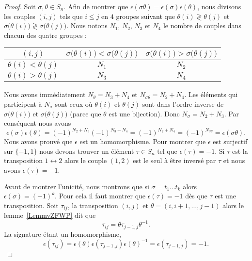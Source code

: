 \begin{proof}
    Soit \( \sigma,\theta \in S_n\). Afin de montrer que \( \epsilon(\sigma\theta )=\epsilon(\sigma)\epsilon(\theta )\), nous divisons les couples \( (i,j)\) tels que \( i\leq j\) en \( 4\) groupes suivant que \( \theta(i)\gtrless \theta(j)\) et \( \sigma\big( \theta(i) \big)\gtrless \sigma\big( \theta(j) \big)\). Nous notons \( N_1\), \( N_2\), \( N_3\) et \( N_4\) le nombre de couples dans chacun des quatre groupes :
    \begin{center}
    \begin{tabular}{c|c|c}
        $ (i,j)$&   \(\sigma\big( \theta(i) \big)<\sigma\big( \theta(j) \big)\)    &   \(\sigma\big( \theta(i) \big)>\sigma\big( \theta(j) \big)\)\\
        \hline
        \( \theta(i)<\theta(j)\)& \( N_1\)&\( N_2\)\\
        \hline
        \( \theta(i)>\theta(j)\)&\( N_3\)&\( N_4\)
    \end{tabular}
    \end{center}
    Nous avons immédiatement \( N_\theta=N_3+N_4\) et \( N_{\sigma\theta}=N_2+N_4\). Les éléments qui participent à \( N_\sigma\) sont ceux où \( \theta(i)\) et \(\theta(j)\) sont dans l'ordre inverse de \( \sigma\big( \theta(i) \big)\) et \( \sigma\big( \theta(j) \big)\) (parce que \(  \theta\) est une bijection). Donc \( N_\sigma=N_2+N_3\). Par conséquent nous avons
    \begin{equation}
        \epsilon(\sigma)\epsilon(\theta)=(-1)^{N_2+N_3}(-1)^{N_3+N_4}=(-1)^{N_2+N_4}=(-1)^{N_{\sigma\theta}}=\epsilon(\sigma\theta).
    \end{equation}
    Nous avons prouvé que \( \epsilon\) est un homomorphisme. Pour montrer que \( \epsilon\) est surjectif sur \( \{ -1,1 \}\) nous devons trouver un élément \( \tau\in S_n\) tel que \( \epsilon(\tau)=-1\). Si \( \tau\) est la transposition \( 1\leftrightarrow 2\) alors le couple \( (1,2)\) est le seul à être inversé par \( \tau\) et nous avons \( \epsilon(\tau)=-1\).

    Avant de montrer l'unicité, nous montrons que si \( \sigma=t_1\ldots t_k\) alors \( \epsilon(\sigma)=(-1)^k\). Pour cela il faut montrer que \( \epsilon(\tau)=-1\) dès que \( \tau\) est une transposition. Soit \( \tau_{ij}\), la transposition \( (i,j)\) et \( \theta=(i,i+1,\ldots, j-1)\) alors le lemme~\ref{LemmvZFWP} dit que
    \begin{equation}
        \tau_{ij}=\theta\tau_{j-1,j}\theta^{-1}.
    \end{equation}
    La signature étant un homomorphisme,
    \begin{equation}
        \epsilon(\tau_{ij})=\epsilon(\theta)\epsilon(\tau_{j-1,j})\epsilon(\theta)^{-1}=\epsilon(\tau_{j-1,j})=-1.
    \end{equation}


\end{proof}
